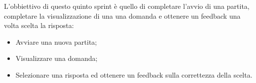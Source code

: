 L'obbiettivo di questo quinto sprint è quello di completare l'avvio di una partita, completare la visualizzazione di una una domanda e ottenere un feedback una volta scelta la risposta:
\begin{itemize}
    \item Avviare una nuova partita;
    \item Visualizzare una domanda;
    \item Selezionare una risposta ed ottenere un feedback sulla correttezza della scelta.
\end{itemize} 


